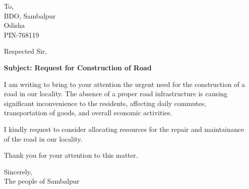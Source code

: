 \documentclass[a4paper,12pt]{letter}
\begin{document}
\begin{letter}{To, \\ BDO, Sambalpur \\ Odisha \\ PIN-768119}

\opening{Respected Sir,}

\begin{flushleft}
\textbf{Subject: Request for Construction of Road}
\end{flushleft}

I am writing to bring to your attention the urgent need for the construction of a road in our locality. The absence of a proper road infrastructure is causing significant inconvenience to the residents, affecting daily commutes, transportation of goods, and overall economic activities.

I kindly request to consider allocating resources for the repair and maintainance of the road in our locality.

Thank you for your attention to this matter.

\closing{Sincerely,\\The people of Sambalpur}

\end{letter}
\end{document}
